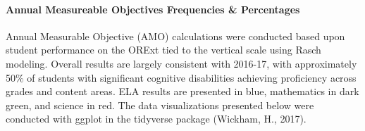 \documentclass[]{article}
\let\oldparagraph\paragraph
\renewcommand{\paragraph}[1]{\oldparagraph{#1}\mbox{}}
\begin{document}
\paragraph{Annual Measureable Objectives Frequencies \&
Percentages}\label{annual-measureable-objectives-frequencies-percentages}

Annual Measurable Objective (AMO) calculations were conducted based upon
student performance on the ORExt tied to the vertical scale using Rasch
modeling. Overall results are largely consistent with 2016-17, with
approximately 50\% of students with significant cognitive disabilities
achieving proficiency across grades and content areas. ELA results are
presented in blue, mathematics in dark green, and science in red. The
data visualizations presented below were conducted with ggplot in the
tidyverse package (Wickham, H., 2017).
\end{document}
